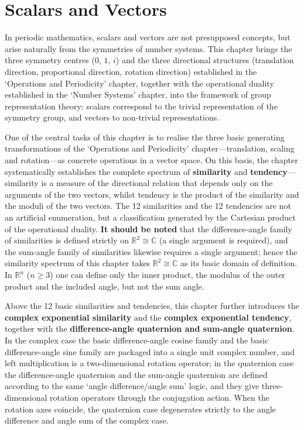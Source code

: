 \chapter{Scalars and Vectors}

\begin{remark}\label{rem:chapter_positioning_ch3}
In periodic mathematics, scalars and vectors are not presupposed concepts, but arise naturally from the symmetries of number systems. This chapter brings the three symmetry centres ($0$, $1$, $i$) and the three directional structures (translation direction, proportional direction, rotation direction) established in the `Operations and Periodicity' chapter, together with the operational duality established in the `Number Systems' chapter, into the framework of group representation theory: scalars correspond to the trivial representation of the symmetry group, and vectors to non-trivial representations.

One of the central tasks of this chapter is to realise the three basic generating transformations of the `Operations and Periodicity' chapter---translation, scaling and rotation---as concrete operations in a vector space. On this basis, the chapter systematically establishes the complete spectrum of \textbf{similarity} and \textbf{tendency}---similarity is a measure of the directional relation that depends only on the arguments of the two vectors, whilst tendency is the product of the similarity and the moduli of the two vectors. The 12 similarities and the 12 tendencies are not an artificial enumeration, but a classification generated by the Cartesian product of the operational duality. \textbf{It should be noted} that the difference-angle family of similarities is defined strictly on $\mathbb{R}^2\cong\mathbb{C}$ (a single argument is required), and the sum-angle family of similarities likewise requires a single argument; hence the similarity spectrum of this chapter takes $\mathbb{R}^2\cong\mathbb{C}$ as its basic domain of definition. In $\mathbb{R}^n$ ($n\ge 3$) one can define only the inner product, the modulus of the outer product and the included angle, but not the sum angle.

Above the 12 basic similarities and tendencies, this chapter further introduces the \textbf{complex exponential similarity} and the \textbf{complex exponential tendency}, together with the \textbf{difference-angle quaternion and sum-angle quaternion}. In the complex case the basic difference-angle cosine family and the basic difference-angle sine family are packaged into a single unit complex number, and left multiplication is a two-dimensional rotation operator; in the quaternion case the difference-angle quaternion and the sum-angle quaternion are defined according to the same `angle difference/angle sum' logic, and they give three-dimensional rotation operators through the conjugation action. When the rotation axes coincide, the quaternion case degenerates strictly to the angle difference and angle sum of the complex case.


\end{remark}

